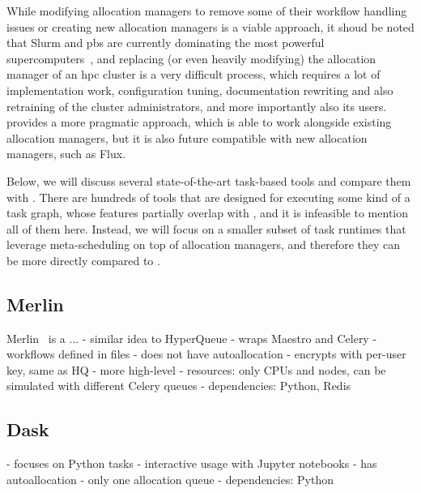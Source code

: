 While modifying allocation managers to remove some of their workflow handling issues or creating
new allocation managers is a viable approach, it shoud be noted that Slurm and
\gls{pbs} are currently dominating the most powerful
supercomputers~\cite{slurm-schedmd}, and replacing (or even heavily modifying) the allocation
manager of an \gls{hpc} cluster is a very difficult process, which requires a lot of
implementation work, configuration tuning, documentation rewriting and also retraining of the
cluster administrators, and more importantly also its users. \hyperqueue{} provides a
more pragmatic approach, which is able to work alongside existing allocation managers, but it is
also future compatible with new allocation managers, such as Flux.

Below, we will discuss several state-of-the-art task-based tools and compare them with
\hyperqueue{}. There are hundreds of tools that are designed for executing some kind of a
task graph, whose features partially overlap with \hyperqueue{}, and it is infeasible to
mention all of them here. Instead, we will focus on a smaller subset of task runtimes that leverage
meta-scheduling on top of allocation managers, and therefore they can be more directly compared to
\hyperqueue{}.

\subsection*{Merlin}
Merlin~\cite{merlin} is a ...  - similar idea to%
HyperQueue - wraps Maestro and Celery - workflows defined in files - does not have autoallocation -
encrypts with per-user key, same as HQ - more high-level - resources: only CPUs and nodes, can be
simulated with different Celery queues - dependencies: Python, Redis

\subsection*{Dask}
- focuses on Python tasks
- interactive usage with Jupyter notebooks
- has autoallocation
- only one allocation queue
- dependencies: Python


